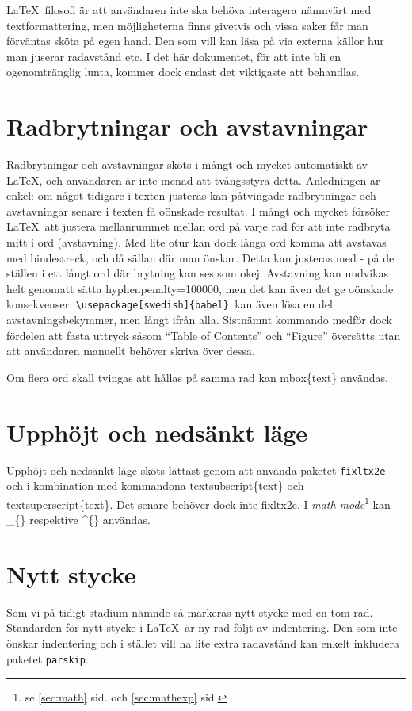 \LaTeX\ filosofi är att användaren inte ska behöva interagera nämnvärt med textformattering, men möjligheterna finns givetvis och vissa saker får man förväntas sköta på egen hand. Den som vill kan läsa på via externa källor hur man juserar radavstånd etc. I det här dokumentet, för att inte bli en ogenomtränglig lunta, kommer dock endast det viktigaste att behandlas.

\section{Radbrytningar och avstavningar}
Radbrytningar och avstavningar sköts i mångt och mycket automatiskt av \LaTeX, och användaren är inte menad att tvångsstyra detta. Anledningen är enkel: om något tidigare i texten justeras kan påtvingade radbrytningar och avstavningar senare i texten få oönskade resultat. I mångt och mycket försöker \LaTeX\ att justera mellanrummet mellan ord på varje rad för att inte radbryta mitt i ord (avstavning). Med lite otur kan dock långa ord komma att avstavas med bindestreck, och då sällan där man önskar. Detta kan justeras med \tb{}- på de ställen i ett långt ord där brytning kan ses som okej. Avstavning kan undvikas helt genomatt sätta  \tb{}hyphenpenalty=100000, men det kan även det ge oönskade konsekvenser. \verb+\usepackage[swedish]{babel} +kan även lösa en del avstavningsbekymmer, men långt ifrån alla. Sistnämnt kommando medför dock fördelen att fasta uttryck såsom ``Table of Contents'' och ``Figure'' översätts utan att användaren manuellt behöver skriva över dessa.

Om flera ord skall tvingas att hållas på samma rad kan \tb{}mbox\{text\} användas.

\section{Upphöjt och nedsänkt läge}\label{sec:textexp}
Upphöjt och nedsänkt läge sköts lättast genom att använda paketet \texttt{fixltx2e} och i kombination med kommandona \tb{}textsubscript\{text\} och \tb{}textsuperscript\{text\}. Det senare behöver dock inte fixltx2e. I \emph{math mode}\footnote{se \ref{sec:math} sid. \pageref{sec:math} och \ref{sec:mathexp} sid. \pageref{sec:mathexp}} kan \_\{\} respektive \^{}\{\} användas.

\section{Nytt stycke}
Som vi på tidigt stadium nämnde så markeras nytt stycke med en tom rad. Standarden för nytt stycke i \LaTeX\ är ny rad följt av indentering. Den som inte önskar indentering och i stället vill ha lite extra radavstånd kan enkelt inkludera paketet \texttt{parskip}.

